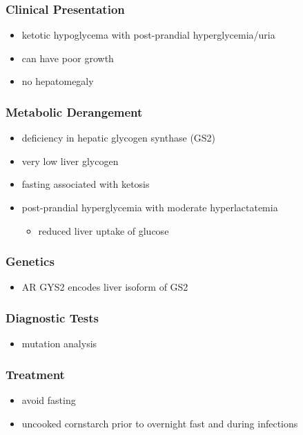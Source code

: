 \documentclass{scrartcl}
\begin{document}
\subsubsection{Clinical Presentation}
\label{sec:orge7023aa}
\begin{itemize}
\item ketotic hypoglycema with post-prandial hyperglycemia/uria
\item can have poor growth
\item no hepatomegaly
\end{itemize}
\subsubsection{Metabolic Derangement}
\label{sec:org5ddb828}
\begin{itemize}
\item deficiency in hepatic glycogen synthase (GS2)
\item very low liver glycogen
\item fasting associated with ketosis
\item post-prandial hyperglycemia with moderate hyperlactatemia
\begin{itemize}
\item reduced liver uptake of glucose
\end{itemize}
\end{itemize}

\subsubsection{Genetics}
\label{sec:orga07aae6}
\begin{itemize}
\item AR GYS2 encodes liver isoform of GS2
\end{itemize}

\subsubsection{Diagnostic Tests}
\label{sec:org153aab2}
\begin{itemize}
\item mutation analysis
\end{itemize}
\subsubsection{Treatment}
\label{sec:orgaa14c41}
\begin{itemize}
\item avoid fasting
\item uncooked cornstarch prior to overnight fast and during infections
\end{itemize}
\end{document}
